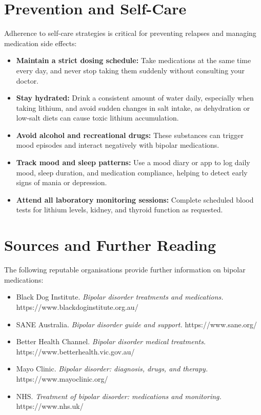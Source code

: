 \section*{Prevention and Self-Care}
Adherence to self-care strategies is critical for preventing relapses and managing medication side effects:
\begin{itemize}
    \item \textbf{Maintain a strict dosing schedule:} Take medications at the same time every day, and never stop taking them suddenly without consulting your doctor.
    \item \textbf{Stay hydrated:} Drink a consistent amount of water daily, especially when taking lithium, and avoid sudden changes in salt intake, as dehydration or low-salt diets can cause toxic lithium accumulation.
    \item \textbf{Avoid alcohol and recreational drugs:} These substances can trigger mood episodes and interact negatively with bipolar medications.
    \item \textbf{Track mood and sleep patterns:} Use a mood diary or app to log daily mood, sleep duration, and medication compliance, helping to detect early signs of mania or depression.
    \item \textbf{Attend all laboratory monitoring sessions:} Complete scheduled blood tests for lithium levels, kidney, and thyroid function as requested.
\end{itemize}

\section*{Sources and Further Reading}
The following reputable organisations provide further information on bipolar medications:
\begin{itemize}
    \item Black Dog Institute. \textit{Bipolar disorder treatments and medications.} https://www.blackdoginstitute.org.au/
    \item SANE Australia. \textit{Bipolar disorder guide and support.} https://www.sane.org/
    \item Better Health Channel. \textit{Bipolar disorder medical treatments.} https://www.betterhealth.vic.gov.au/
    \item Mayo Clinic. \textit{Bipolar disorder: diagnosis, drugs, and therapy.} https://www.mayoclinic.org/
    \item NHS. \textit{Treatment of bipolar disorder: medications and monitoring.} https://www.nhs.uk/
\end{itemize}
